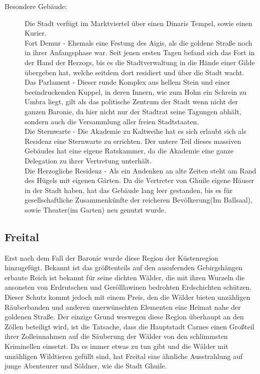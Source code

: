 \documentclass[a4paper,12pt,oneside]{book}
\begin{document}
\begin{description}
\item[Besondere Gebäude:]Die Stadt verfügt im Marktviertel über einen Dinaris Tempel, sowie einen Kurier.  
\\Fort Demur - Ehemals eine Festung des Aigis, als die goldene Straße noch in ihrer Anfangsphase war. Seit jenen ersten Tagen befand sich das Fort in der Hand der Herzogs, bis es die Stadtverwaltung in die Hände einer Gilde übergeben hat, welche seitdem dort residiert und über die Stadt wacht.
\\Das Parlament - Dieser runde Komplex aus hellem Stein und einer beeindruckenden Kuppel, in deren Innern, wie zum Hohn ein Schrein zu Umbra liegt, gilt als das politische Zentrum der Stadt wenn nicht der ganzen Baronie, da hier nicht nur der Stadtrat seine Tagungen abhält, sondern auch die Versammlung aller freien Stadtstaaten.
\\Die Sternwarte - Die Akademie zu Kaltweihe hat es sich erlaubt sich als Residenz eine Sternwarte zu errichten. Der untere Teil dieses massiven Gebäudes hat eine eigene Ratskammer, da die Akademie eine ganze Delegation zu ihrer Vertretung unterhält.
\\Die Herzogliche Residenz - Als ein Andenken an alte Zeiten steht am Rand des Hügels mit eigenen Gärten. Da die Vertreter von Ghuile eigene Häuser in der Stadt haben, hat das Gebäude lang leer gestanden, bis es für gesellschaftliche Zusammenkünfte der reicheren Bevölkerung(Im Ballsaal), sowie Theater(im Garten) neu genutzt wurde.
\end{description}

\subsection{Freital}
Erst nach dem Fall der Baronie wurde diese Region der Küstenregion hinzugefügt. Bekannt ist das größtenteils auf den ausufernden Gebirgshängen erbaute Reich ist bekannt für seine dichten Wälder, die mit ihren Wurzeln die ansonsten von Erdrutschen und Gerölllawinen bedrohten Erdschichten schützen. Dieser Schutz kommt jedoch mit einem Preis, den die Wälder bieten unzähligen Räuberbanden und anderen unerwünschten Elementen eine Heimat nahe der goldenen Straße. Der einzige Grund weswegen diese Region überhaupt an den Zöllen beteiligt wird, ist die Tatsache, dass die Hauptstadt Carnes einen Großteil ihrer Zolleinnahmen auf die Säuberung der Wälder von den schlimmsten Kriminellen einsetzt. Da es immer etwas zu tun gibt und die Wälder mit unzähligen Wildtieren gefüllt sind, hat Freital eine ähnliche Ausstrahlung auf junge Abenteurer und Söldner, wie die Stadt Ghuile.
\end{document}
